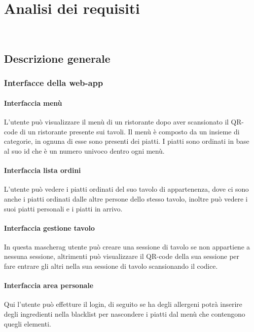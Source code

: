 
\chapter{Analisi dei requisiti}
\label{cap:analisi dei requisiti}

\\

\section{Descrizione generale}
\subsection{Interfacce della web-app}
\subsubsection{Interfaccia menù}
L'utente può visualizzare il menù di un ristorante dopo aver scansionato il QR-code di un ristorante presente sui tavoli. Il menù è composto da un insieme di categorie, in ognuna di esse sono presenti dei piatti. I piatti sono ordinati in base al suo id che è un numero univoco dentro ogni menù.
\subsubsection{Interfaccia lista ordini}
L'utente può vedere i piatti ordinati del suo tavolo di appartenenza, dove ci sono anche i piatti ordinati dalle altre persone dello stesso tavolo, inoltre può vedere i suoi piatti personali e i piatti in arrivo.
\subsubsection{Interfaccia gestione tavolo}
In questa \gls{mascherag} utente può creare una sessione di tavolo se non appartiene a nessuna sessione, altrimenti può visualizzare il QR-code della sua sessione per fare entrare gli altri nella sua sessione di tavolo scansionando il codice.
\subsubsection{Interfaccia area personale}
Qui l'utente può effetture il login, di seguito se ha degli allergeni potrà inserire degli ingredienti nella blacklist per nascondere i piatti dal menù che contengono quegli elementi.
